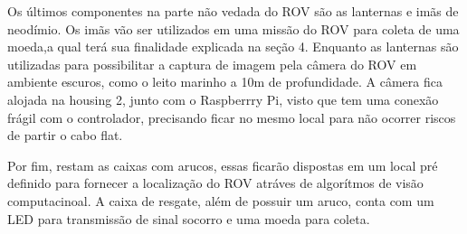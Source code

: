 Os últimos componentes na parte não vedada do ROV são as lanternas e imãs de neodímio. Os imãs vão ser utilizados em uma missão do ROV para coleta de uma moeda,a qual terá sua finalidade explicada na seção 4. Enquanto as lanternas são utilizadas para possibilitar a captura de imagem pela câmera do ROV em ambiente escuros, como o leito marinho a 10m de profundidade. A câmera fica alojada na housing 2, junto com o Raspberrry Pi, visto que tem uma conexão frágil com o controlador, precisando ficar no mesmo local para não ocorrer riscos de partir o cabo flat.

Por fim, restam as caixas com arucos, essas ficarão dispostas em um local pré definido para fornecer a localização do ROV atráves de algorítmos de visão computacinoal. A caixa de resgate, além de possuir um aruco, conta com um LED para transmissão de sinal socorro e uma moeda para coleta.
